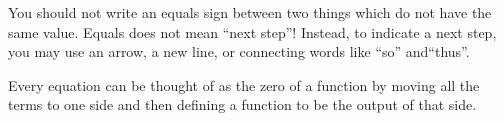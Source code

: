 \documentclass{ximera}
\begin{document}
\begin{summary}
\item You should not write an equals sign between two things which do not have the same value.  Equals does not mean ``next step''!  Instead, to indicate a next step, you may use an arrow, a new line, or connecting words like ``so'' and``thus''.
\item  Every equation can be thought of as the zero of a function by moving all the terms to one side and then defining a function to be the output of that side.
\end{summary}



\end{document}
